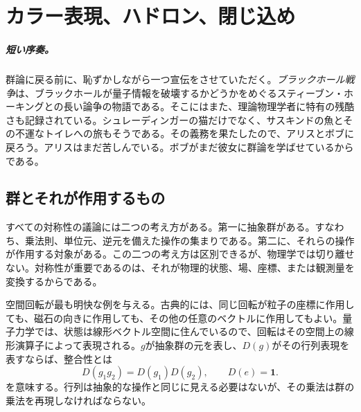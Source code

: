 \chapter{カラー表現、ハドロン、閉じ込め}

\paragraph{短い序奏。}
群論に戻る前に、恥ずかしながら一つ宣伝をさせていただく。\emph{ブラックホール戦争}は、ブラックホールが量子情報を破壊するかどうかをめぐるスティーブン・ホーキングとの長い論争の物語である。そこにはまた、理論物理学者に特有の残酷さも記録されている。シュレーディンガーの猫だけでなく、サスキンドの魚とその不運なトイレへの旅もそうである。その義務を果たしたので、アリスとボブに戻ろう。アリスはまだ苦しんでいる。ボブがまだ彼女に群論を学ばせているからである。


\section{群とそれが作用するもの}

すべての対称性の議論には二つの考え方がある。第一に抽象群がある。すなわち、乗法則、単位元、逆元を備えた操作の集まりである。第二に、それらの操作が作用する対象がある。この二つの考え方は区別できるが、物理学では切り離せない。対称性が重要であるのは、それが物理的状態、場、座標、または観測量を変換するからである。

\begin{classroomqa}
\end{classroomqa}

空間回転が最も明快な例を与える。古典的には、同じ回転が粒子の座標に作用しても、磁石の向きに作用しても、その他の任意のベクトルに作用してもよい。量子力学では、状態は線形ベクトル空間に住んでいるので、回転はその空間上の線形演算子によって表現される。\(g\)が抽象群の元を表し、\(D(g)\)がその行列表現を表すならば、整合性とは
\begin{equation}
D(g_1g_2)=D(g_1)D(g_2),
\qquad
D(e)=\boldsymbol 1.
\end{equation}
を意味する。行列は抽象的な操作と同じに見える必要はないが、その乗法は群の乗法を再現しなければならない。

